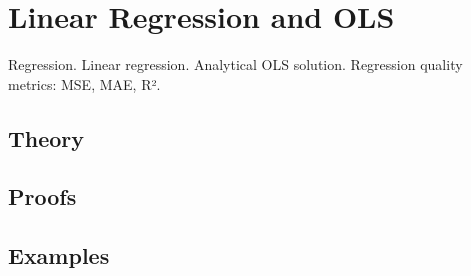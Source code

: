 
\section{Linear Regression and OLS}
\label{sec:1.4.02-linear-regression-ols}

\begin{ticket}
Regression. Linear regression. Analytical OLS solution. Regression quality metrics: MSE, MAE, R².
\end{ticket}

\subsection*{Theory}

\subsection*{Proofs}

\subsection*{Examples}
